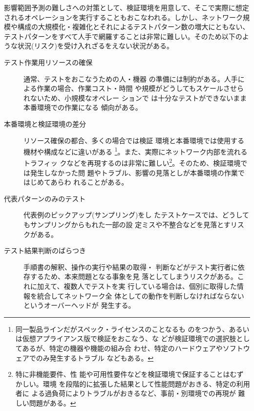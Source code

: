 影響範囲予測の難しさへの対策として、検証環境を用意して、そこで実際に想定
されるオペレーションを実行することもおこなわれる。しかし、ネットワーク規
模や構成の大規模化・複雑化とそれによるテストパターン数の増大にともない、
テストパターンをすべて人手で網羅することは非常に難しい。そのため以下のよ
うな状況(リスク)を受け入れざるをえない状況がある。
\begin{description}
 \item[テスト作業用リソースの確保] 通常、テストをおこなうための人・機器
            の準備には制約がある。人手による作業の場合、作業コスト・時間
            や規模がどうしてもスケールさせられないため、小規模なオペレー
            ションで は十分なテストができないまま本番環境での作業になる
            傾向がある。
 \item[本番環境と検証環境の差分] リソース確保の都合、多くの場合では検証
            環境と本番環境では使用する機材や構成などに違いがある
            \footnote{同一製品ラインだがスペック・ライセンスのことなるも
            のをつかう、あるいは仮想アプライアンス版で検証をおこなう、な
            どが検証環境での選択肢としてあるが、特定の機器や機能の組み合
            わせ、特定のハードウェアやソフトウェアでのみ発生するトラブル
            などもある。}。また、実際にネットワーク内部を流れるトラフィッ
            クなどを再現するのは非常に難しい\footnote{特に非機能要件、性
            能や可用性要件などを検証環境で保証することはむずかしい。環境
            を段階的に拡張した結果として性能問題がおきる、特定の利用者に
            よる過負荷によりトラブルがおきるなど、事前・別環境での再現が
            難しい問題がある。}。そのため、検証環境では発生しなかった問
            題やトラブル、影響の見落としが本番環境の作業ではじめてあらわ
            れることがある。
 \item[代表パターンのみのテスト] 代表例のピックアップ(サンプリング)をし
            たテストケースでは、どうしてもサンプリングからもれた一部の設
            定ミスや不整合などを見落とすリスクがある。
 \item[テスト結果判断のばらつき] 手順書の解釈、操作の実行や結果の取得・
            判断などがテスト実行者に依存するため、本来問題となる事象を見
            落としてしまうリスクがある。これに加えて、複数人でテストを実
            行している場合は、個別に取得した情報を統合してネットワーク全
            体としての動作を判断しなければならないというオーバーヘッドが
            発生する。
\end{description}

